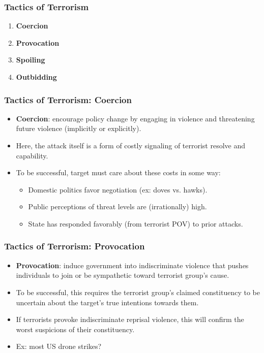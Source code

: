 \documentclass{beamer}
\begin{document}
\begin{frame} 
	\frametitle{\LARGE{Tactics of Terrorism}}
	\begin{enumerate}
		\item \textbf{Coercion}
		
		\item \textbf{Provocation}
		
		\item \textbf{Spoiling} 
		
		\item \textbf{Outbidding}
	\end{enumerate}
\end{frame}

\begin{frame} 
\frametitle{\LARGE{Tactics of Terrorism: Coercion}}
\begin{itemize}
		\item \textbf{Coercion}: encourage policy change by engaging in violence and threatening future violence (implicitly or explicitly). \pause 
		\item Here, the attack itself is a form of costly signaling of terrorist resolve and capability. \pause
		\item To be successful, target must care about these costs in some way: \pause
		\begin{itemize}
			\item Domestic politics favor negotiation (ex: doves vs. hawks). \pause
			\item Public perceptions of threat levels are (irrationally) high. \pause
			\item State has responded favorably (from terrorist POV) to prior attacks.
		\end{itemize}

		
\end{itemize}
\end{frame}

\begin{frame} 
	\frametitle{\LARGE{Tactics of Terrorism: Provocation}}
	\begin{itemize}
		\item \textbf{Provocation}: induce government into indiscriminate violence that pushes individuals to join or be sympathetic toward terrorist group's cause. \pause
		\item To be successful, this requires the terrorist group's claimed constituency to be uncertain about the target's true intentions towards them. \pause
		\item If terrorists provoke indiscriminate reprisal violence, this will confirm the worst suspicions of their constituency.
		\item Ex: most US drone strikes?
	\end{itemize}
\end{frame}
\end{document}

